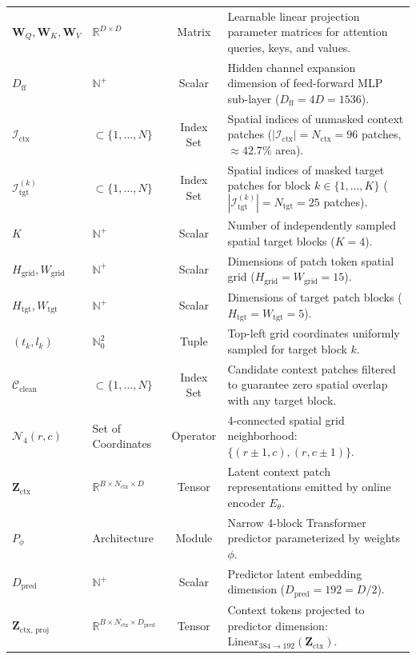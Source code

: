 \documentclass{article}
\begin{document}
\begin{table}[ht]
{\begin{tabular}{llcp{8.6cm}}
$\mathbf{W}_Q, \mathbf{W}_K, \mathbf{W}_V$ & $\mathbb{R}^{D \times D}$ & Matrix & Learnable linear projection parameter matrices for attention queries, keys, and values. \\
$D_{\text{ff}}$ & $\mathbb{N}^+$ & Scalar & Hidden channel expansion dimension of feed-forward MLP sub-layer ($D_{\text{ff}} = 4D = 1536$). \\
$\mathcal{I}_{\text{ctx}}$ & $\subset \{1, \dots, N\}$ & Index Set & Spatial indices of unmasked context patches ($|\mathcal{I}_{\text{ctx}}| = N_{\text{ctx}} = 96$ patches, $\approx 42.7\%$ area). \\
$\mathcal{I}_{\text{tgt}}^{(k)}$ & $\subset \{1, \dots, N\}$ & Index Set & Spatial indices of masked target patches for block $k \in \{1, \dots, K\}$ ($|\mathcal{I}_{\text{tgt}}^{(k)}| = N_{\text{tgt}} = 25$ patches). \\
$K$ & $\mathbb{N}^+$ & Scalar & Number of independently sampled spatial target blocks ($K = 4$). \\
$H_{\text{grid}}, W_{\text{grid}}$ & $\mathbb{N}^+$ & Scalar & Dimensions of patch token spatial grid ($H_{\text{grid}} = W_{\text{grid}} = 15$). \\
$H_{\text{tgt}}, W_{\text{tgt}}$ & $\mathbb{N}^+$ & Scalar & Dimensions of target patch blocks ($H_{\text{tgt}} = W_{\text{tgt}} = 5$). \\
$(t_k, l_k)$ & $\mathbb{N}_0^2$ & Tuple & Top-left grid coordinates uniformly sampled for target block $k$. \\
$\mathcal{C}_{\text{clean}}$ & $\subset \{1, \dots, N\}$ & Index Set & Candidate context patches filtered to guarantee zero spatial overlap with any target block. \\
$\mathcal{N}_4(r, c)$ & Set of Coordinates & Operator & 4-connected spatial grid neighborhood: $\{(r\pm 1, c), (r, c\pm 1)\}$. \\
$\mathbf{Z}_{\text{ctx}}$ & $\mathbb{R}^{B \times N_{\text{ctx}} \times D}$ & Tensor & Latent context patch representations emitted by online encoder $E_\theta$. \\
$P_\phi$ & Architecture & Module & Narrow 4-block Transformer predictor parameterized by weights $\phi$. \\
$D_{\text{pred}}$ & $\mathbb{N}^+$ & Scalar & Predictor latent embedding dimension ($D_{\text{pred}} = 192 = D/2$). \\
$\mathbf{Z}_{\text{ctx, proj}}$ & $\mathbb{R}^{B \times N_{\text{ctx}} \times D_{\text{pred}}}$ & Tensor & Context tokens projected to predictor dimension: $\text{Linear}_{384 \to 192}(\mathbf{Z}_{\text{ctx}})$. \\

\end{tabular}}
\end{table}
\end{document}
